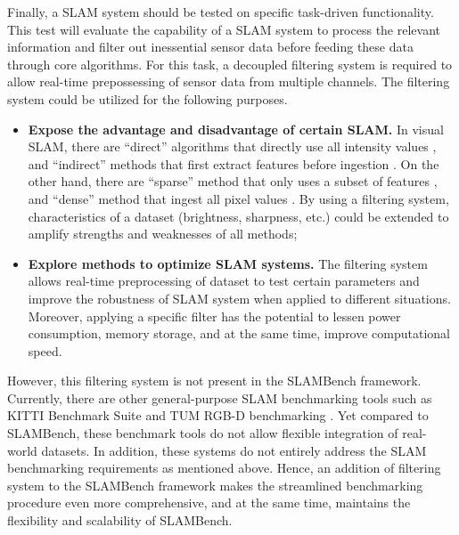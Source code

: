 Finally, a SLAM system should be tested on specific task-driven functionality. 
This test will evaluate the capability of a SLAM system to process the relevant information and filter out inessential sensor data before feeding these data through core algorithms. 
For this task, a decoupled filtering system is required to allow real-time prepossessing of sensor data from multiple channels. 
The filtering system could be utilized for the following purposes.
\begin{itemize}
	\item \textbf{Expose the advantage and disadvantage of certain SLAM.} In visual SLAM, there are “direct” algorithms that directly use all intensity values \cite{newcombe2011kinectfusion}, and “indirect” methods that first extract features before ingestion \cite{davison2007monoslam}. On the other hand, there are “sparse” method that only uses a subset of features \cite{newcombe2011kinectfusion}, and “dense” method that ingest all pixel values \cite{whelan2015elasticfusion}. By using a filtering system, characteristics of a dataset (brightness, sharpness, etc.) could be extended to amplify strengths and weaknesses of all methods;
	\item \textbf{Explore methods to optimize SLAM systems.} The filtering system allows real-time preprocessing of dataset to test certain parameters and improve the robustness of SLAM system when applied to different situations. Moreover, applying a specific filter has the potential to lessen power consumption, memory storage, and at the same time, improve computational speed.
\end{itemize}

However, this filtering system is not present in the SLAMBench framework. 
Currently, there are other general-purpose SLAM benchmarking tools such as KITTI Benchmark Suite \cite{geiger2012we} and TUM RGB-D benchmarking \cite{sturm2012benchmark}. 
Yet compared to SLAMBench, these benchmark tools do not allow flexible integration of real-world datasets. 
In addition, these systems do not entirely address the SLAM benchmarking requirements as mentioned above. 
Hence, an addition of filtering system to the SLAMBench framework makes the streamlined benchmarking procedure even more comprehensive, and at the same time, maintains the flexibility and scalability of SLAMBench. 


